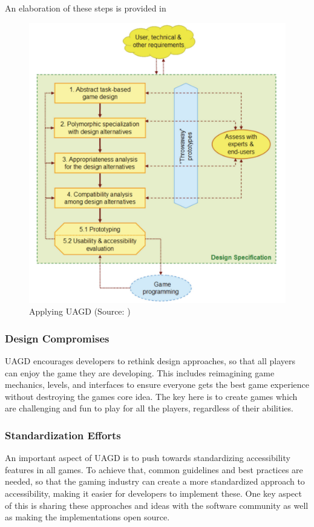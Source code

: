 \documentclass[sigconf,natbib=false,10pt]{acmart}
\begin{document}
	An elaboration of these steps is provided in \textcite{grammenos_unified_2007}
	
	\begin{figure}[ht]
		\centering
		\includegraphics[scale=0.5]{assets/universal-game-design-approach.png}
		\caption{Applying UAGD (Source: \textcite{grammenos_unified_2007})}
		\label{fig:universal-game-design-approach}
	\end{figure}
	
	\subsubsection{Design Compromises}
	UAGD encourages developers to rethink design approaches, so that all players can enjoy the game they are developing.
	This includes reimagining game mechanics, levels, and interfaces to ensure everyone gets the best game experience without destroying the games core idea.
	The key here is to create games which are challenging and fun to play for all the players, regardless of their abilities.
	
	\subsubsection{Standardization Efforts}
	An important aspect of UAGD is to push towards standardizing accessibility features in all games.
	To achieve that, common guidelines and best practices are needed, so that the gaming industry can create a more standardized approach to accessibility, making it easier for developers to implement these.
	One key aspect of this is sharing these approaches and ideas with the software community as well as making the implementations open source.
	
\end{document}
